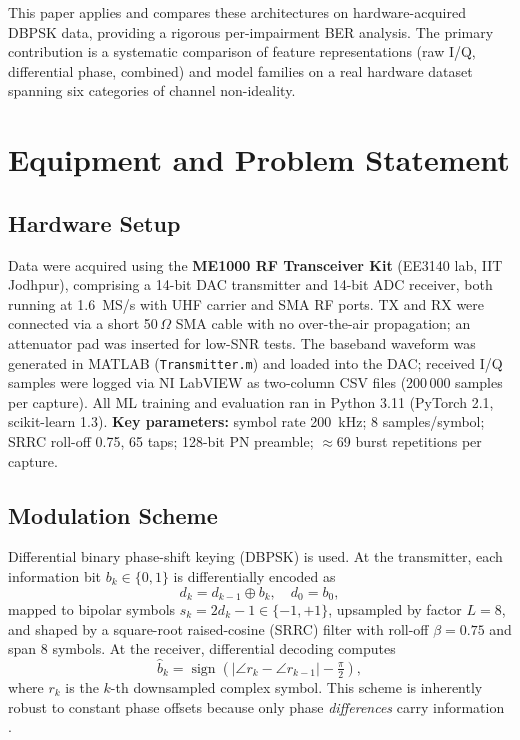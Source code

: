 \documentclass[journal]{IEEEtran}
\begin{document}
This paper applies and compares these architectures on hardware-acquired DBPSK data,
providing a rigorous per-impairment BER analysis. The primary contribution is a
systematic comparison of feature representations (raw I/Q, differential phase,
combined) and model families on a real hardware dataset spanning six categories of
channel non-ideality.

\section{Equipment and Problem Statement}
\label{sec:problem}

\subsection{Hardware Setup}

Data were acquired using the \textbf{ME1000 RF Transceiver Kit} (EE3140 lab,
IIT Jodhpur), comprising a 14-bit DAC transmitter and 14-bit ADC receiver, both
running at \SI{1.6}{\mega S/s} with UHF carrier and SMA RF ports.  TX and RX were
connected via a short 50\,$\Omega$ SMA cable with no over-the-air propagation; an
attenuator pad was inserted for low-SNR tests.  The baseband waveform was generated
in MATLAB (\texttt{Transmitter.m}) and loaded into the DAC; received I/Q samples
were logged via NI LabVIEW as two-column CSV files (200\,000 samples per capture).
All ML training and evaluation ran in Python 3.11 (PyTorch 2.1, scikit-learn 1.3).
\textbf{Key parameters:} symbol rate \SI{200}{\kilo\hertz}; 8 samples/symbol;
SRRC roll-off 0.75, 65 taps; 128-bit PN preamble; $\approx$69 burst repetitions
per capture.

\subsection{Modulation Scheme}

Differential binary phase-shift keying (DBPSK) is used. At the transmitter,
each information bit $b_k \in \{0,1\}$ is differentially encoded as
\begin{equation}
  d_k = d_{k-1} \oplus b_k, \quad d_0 = b_0,
\end{equation}
mapped to bipolar symbols $s_k = 2d_k - 1 \in \{-1,+1\}$, upsampled by factor
$L=8$, and shaped by a square-root raised-cosine (SRRC) filter with roll-off
$\beta = 0.75$ and span 8 symbols. At the receiver, differential decoding computes
\begin{equation}
  \hat{b}_k = \operatorname{sign}\!\left(|\angle r_k - \angle r_{k-1}| - \tfrac{\pi}{2}\right),
  \label{eq:diffdec}
\end{equation}
where $r_k$ is the $k$-th downsampled complex symbol. This scheme is inherently
robust to constant phase offsets because only phase \emph{differences} carry
information \cite{proakis2008digital}.
\end{document}
